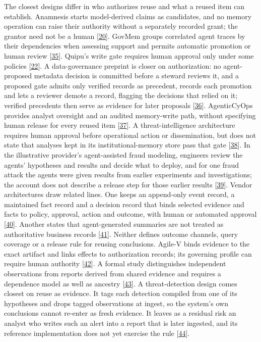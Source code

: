 \documentclass[
  11pt,
]{article}
\begin{document}
The closest designs differ in who authorizes reuse and what a reused
item can establish. Anamnesis starts model-derived claims as candidates,
and no memory operation can raise their authority without a separately
recorded grant; the grantor need not be a human
{[}\protect\hyperlink{ref-Dan2026Anamnesis}{20}{]}. GovMem groups
correlated agent traces by their dependencies when assessing support and
permits automatic promotion or human review
{[}\protect\hyperlink{ref-Qi2026GovMem}{35}{]}. Quipu's write gate
requires human approval only under some policies
{[}\protect\hyperlink{ref-Brown2026Quipu}{22}{]}. A data-governance
preprint is closer on authorization: no agent-proposed metadata decision
is committed before a steward reviews it, and a proposed gate admits
only verified records as precedent, records each promotion and lets a
reviewer demote a record, flagging the decisions that relied on it;
verified precedents then serve as evidence for later proposals
{[}\protect\hyperlink{ref-Akhtar2026Contestable}{36}{]}. AgenticCyOps
provides analyst oversight and an audited memory-write path, without
specifying human release for every reused item
{[}\protect\hyperlink{ref-Mitra2026AgenticCyOps}{37}{]}. A
threat-intelligence architecture requires human approval before
operational action or dissemination, but does not state that analyses
kept in its institutional-memory store pass that gate
{[}\protect\hyperlink{ref-AlbarrakJagtap2026Industry4CTI}{38}{]}. In the
illustrative provider's agent-assisted fraud modeling, engineers review
the agents' hypotheses and results and decide what to deploy, and for
one fraud attack the agents were given results from earlier experiments
and investigations; the account does not describe a release step for
those earlier results
{[}\protect\hyperlink{ref-Drapeau2026ScalingRadar}{39}{]}. Vendor
architectures draw related lines. One keeps an append-only event record,
a maintained fact record and a decision record that binds selected
evidence and facts to policy, approval, action and outcome, with human
or automated approval
{[}\protect\hyperlink{ref-Alten2026DecisionRecords}{40}{]}. Another
states that agent-generated summaries are not treated as authoritative
business records
{[}\protect\hyperlink{ref-Talamadupula2026AgentMemory}{41}{]}. Neither
defines outcome channels, query coverage or a release rule for reusing
conclusions. Agile-V binds evidence to the exact artifact and links
effects to authorization records; its governing profile can require
human authority {[}\protect\hyperlink{ref-Koch2026AgileV}{42}{]}. A
formal study distinguishes independent observations from reports derived
from shared evidence and requires a dependence model as well as ancestry
{[}\protect\hyperlink{ref-Bara2026EpistemicSybil}{43}{]}. A
threat-detection design comes closest on reuse as evidence. It tags each
detection compiled from one of its hypotheses and drops tagged
observations at ingest, so the system's own conclusions cannot re-enter
as fresh evidence. It leaves as a residual risk an analyst who writes
such an alert into a report that is later ingested, and its reference
implementation does not yet exercise the rule
{[}\protect\hyperlink{ref-Evron2026AdversaryBrains}{44}{]}.
\end{document}
